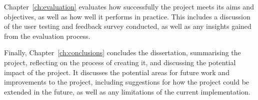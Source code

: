 \documentclass[../main.tex]{subfiles}
\begin{document}
        Chapter~\ref{ch:evaluation} evaluates how successfully the project meets its
            aims and objectives, as well as how well it performs in practice.
        This includes a discussion of the user testing and feedback survey conducted,
            as well as any insights gained from the evaluation process.

        Finally, Chapter~\ref{ch:conclusions} concludes the dissertation, summarising
            the project, reflecting on the process of creating it, and discussing the
            potential impact of the project.
        It discusses the potential areas for future work and improvements to the
            project, including suggestions for how the project could be extended in the
            future, as well as any limitations of the current implementation.
\end{document}
